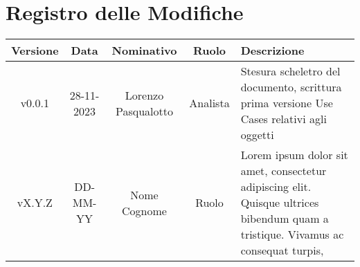 \section*{\Large Registro delle Modifiche}
    \begin{table}[h]
        \centering
        \renewcommand\tabularxcolumn[1]{m{#1}} %
        \renewcommand{\arraystretch}{1.5}
        \begin{tabularx}{0.98\textwidth}
            {c|c|c|c|>{\centering\arraybackslash}X}
            \rowcolor{black}
            \textbf{\color{white} Versione} & \textbf{\color{white} Data} & \textbf{\color{white} Nominativo} & \textbf{\color{white} Ruolo} & \textbf{\color{white} Descrizione} \\ 
            \hline

            v0.0.1 & 28-11-2023 & Lorenzo Pasqualotto & Analista & Stesura scheletro del documento, scrittura prima versione Use Cases relativi agli oggetti \\
            vX.Y.Z & DD-MM-YY & Nome Cognome & Ruolo & Lorem ipsum dolor sit amet, consectetur adipiscing elit. Quisque ultrices bibendum quam a tristique. Vivamus ac consequat turpis, \\
            \hline
        \end{tabularx}
    \end{table}